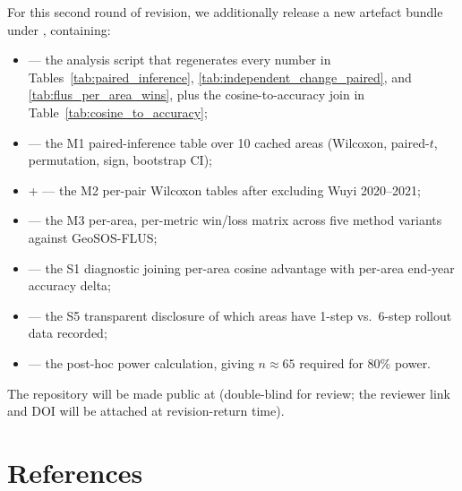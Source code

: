 \documentclass{article}
\begin{document}
For this second round of revision, we additionally release a new artefact bundle under , containing:
\begin{itemize}
\item {} --- the analysis script that regenerates every number in Tables~\ref{tab:paired_inference}, \ref{tab:independent_change_paired}, and \ref{tab:flus_per_area_wins}, plus the cosine-to-accuracy join in Table~\ref{tab:cosine_to_accuracy};
\item {} --- the M1 paired-inference table over 10 cached areas (Wilcoxon, paired-$t$, permutation, sign, bootstrap CI);
\item {} +  --- the M2 per-pair Wilcoxon tables after excluding Wuyi 2020--2021;
\item {} --- the M3 per-area, per-metric win/loss matrix across five method variants against GeoSOS-FLUS;
\item {} --- the S1 diagnostic joining per-area cosine advantage with per-area end-year accuracy delta;
\item {} --- the S5 transparent disclosure of which areas have 1-step vs.\ 6-step rollout data recorded;
\item {} --- the post-hoc power calculation, giving $n \approx 65$ required for 80\% power.
\end{itemize}

The repository will be made public at  (double-blind for review; the reviewer link and DOI will be attached at revision-return time).


\section*{References}
\end{document}
